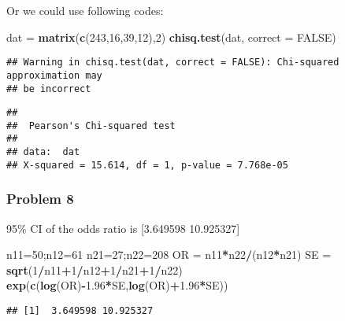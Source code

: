 \documentclass[]{article}
\newenvironment{Shaded}{\begin{snugshade}}{\end{snugshade}}
\newcommand{\KeywordTok}[1]{\textcolor[rgb]{0.13,0.29,0.53}{\textbf{#1}}}
\newcommand{\DataTypeTok}[1]{\textcolor[rgb]{0.13,0.29,0.53}{#1}}
\newcommand{\DecValTok}[1]{\textcolor[rgb]{0.00,0.00,0.81}{#1}}
\newcommand{\FloatTok}[1]{\textcolor[rgb]{0.00,0.00,0.81}{#1}}
\newcommand{\StringTok}[1]{\textcolor[rgb]{0.31,0.60,0.02}{#1}}
\newcommand{\OtherTok}[1]{\textcolor[rgb]{0.56,0.35,0.01}{#1}}
\newcommand{\OperatorTok}[1]{\textcolor[rgb]{0.81,0.36,0.00}{\textbf{#1}}}
\newcommand{\NormalTok}[1]{#1}
\begin{document}
Or we could use following codes:

\begin{Shaded}
\begin{Highlighting}[]
\NormalTok{dat =}\StringTok{ }\KeywordTok{matrix}\NormalTok{(}\KeywordTok{c}\NormalTok{(}\DecValTok{243}\NormalTok{,}\DecValTok{16}\NormalTok{,}\DecValTok{39}\NormalTok{,}\DecValTok{12}\NormalTok{),}\DecValTok{2}\NormalTok{)}
\KeywordTok{chisq.test}\NormalTok{(dat, }\DataTypeTok{correct =} \OtherTok{FALSE}\NormalTok{)}
\end{Highlighting}
\end{Shaded}

\begin{verbatim}
## Warning in chisq.test(dat, correct = FALSE): Chi-squared approximation may
## be incorrect
\end{verbatim}

\begin{verbatim}
## 
##  Pearson's Chi-squared test
## 
## data:  dat
## X-squared = 15.614, df = 1, p-value = 7.768e-05
\end{verbatim}

\subsubsection{Problem 8}\label{problem-8}

95\% CI of the odds ratio is {[}3.649598 10.925327{]}

\begin{Shaded}
\begin{Highlighting}[]
\NormalTok{n11=}\DecValTok{50}\NormalTok{;n12=}\DecValTok{61}
\NormalTok{n21=}\DecValTok{27}\NormalTok{;n22=}\DecValTok{208}
\NormalTok{OR =}\StringTok{ }\NormalTok{n11}\OperatorTok{*}\NormalTok{n22}\OperatorTok{/}\NormalTok{(n12}\OperatorTok{*}\NormalTok{n21)}
\NormalTok{SE =}\StringTok{ }\KeywordTok{sqrt}\NormalTok{(}\DecValTok{1}\OperatorTok{/}\NormalTok{n11}\OperatorTok{+}\DecValTok{1}\OperatorTok{/}\NormalTok{n12}\OperatorTok{+}\DecValTok{1}\OperatorTok{/}\NormalTok{n21}\OperatorTok{+}\DecValTok{1}\OperatorTok{/}\NormalTok{n22)}
\KeywordTok{exp}\NormalTok{(}\KeywordTok{c}\NormalTok{(}\KeywordTok{log}\NormalTok{(OR)}\OperatorTok{-}\FloatTok{1.96}\OperatorTok{*}\NormalTok{SE,}\KeywordTok{log}\NormalTok{(OR)}\OperatorTok{+}\FloatTok{1.96}\OperatorTok{*}\NormalTok{SE))}
\end{Highlighting}
\end{Shaded}

\begin{verbatim}
## [1]  3.649598 10.925327
\end{verbatim}
\end{document}

